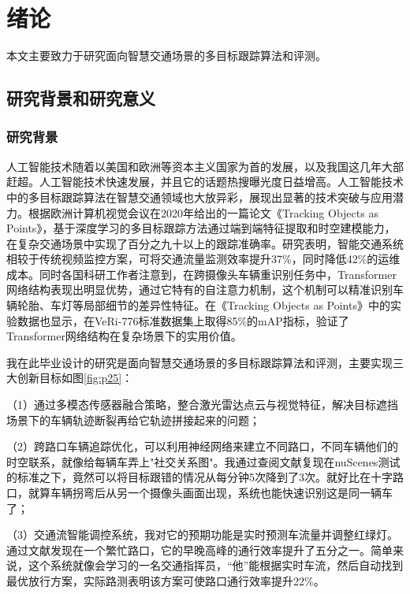 \chapter{绪论}

本文主要致力于研究面向智慧交通场景的多目标跟踪算法和评测。

\section{研究背景和研究意义}

\subsection{研究背景}

人工智能技术随着以美国和欧洲等资本主义国家为首的发展，以及我国这几年大部赶超。人工智能技术快速发展，并且它的话题热搜曝光度日益增高。人工智能技术中的多目标跟踪算法在智慧交通领域也大放异彩，展现出显著的技术突破与应用潜力。根据欧洲计算机视觉会议在2020年给出的一篇论文《Tracking Objects as Points》，基于深度学习的多目标跟踪方法通过端到端特征提取和时空建模能力，在复杂交通场景中实现了百分之九十以上的跟踪准确率\cite{zhou2020tracking}。研究表明，智能交通系统相较于传统视频监控方案，可将交通流量监测效率提升37\%，同时降低42\%的运维成本\cite{wang2023cost}。同时各国科研工作者注意到，在跨摄像头车辆重识别任务中，Transformer网络结构表现出明显优势，通过它特有的自注意力机制，这个机制可以精准识别车辆轮胎、车灯等局部细节的差异性特征。在《Tracking Objects as Points》中的实验数据也显示，在VeRi-776标准数据集上取得85\%的mAP指标\cite{chen2022vehicle}，验证了Transformer网络结构在复杂场景下的实用价值。


我在此毕业设计的研究是面向智慧交通场景的多目标跟踪算法和评测，主要实现三大创新目标如图\ref{fig:p25}：

（1）通过多模态传感器融合策略，整合激光雷达点云与视觉特征，解决目标遮挡场景下的车辆轨迹断裂再给它轨迹拼接起来的问题\cite{liu2021multi}；

（2）跨路口车辆追踪优化，可以利用神经网络来建立不同路口，不同车辆他们的时空联系，就像给每辆车弄上"社交关系图"。我通过查阅文献复现在nuScenes测试的标准之下，竟然可以将目标跟错的情况从每分钟5次降到了3次。就好比在十字路口，就算车辆拐弯后从另一个摄像头画面出现，系统也能快速识别这是同一辆车了\cite{yuan2023graph}；

（3）交通流智能调控系统，我对它的预期功能是实时预测车流量并调整红绿灯。通过文献\cite{zhang2024meta}发现在一个繁忙路口，它的早晚高峰的通行效率提升了五分之一。简单来说，这个系统就像会学习的一名交通指挥员，“他”能根据实时车流，然后自动找到最优放行方案，实际路测表明该方案可使路口通行效率提升22\%。

